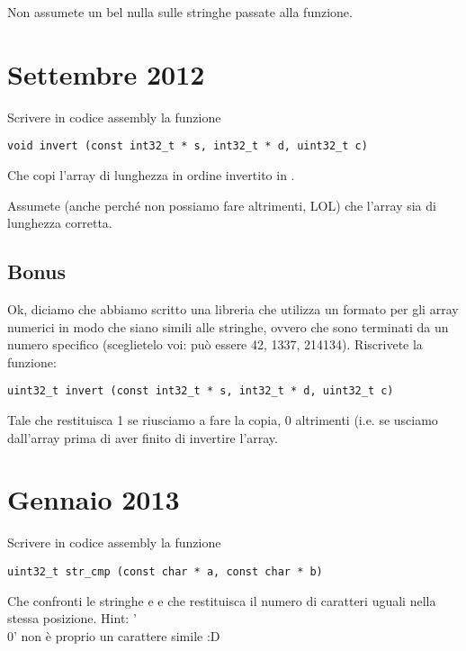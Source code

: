 \documentclass[a4paper]{memoir}
\begin{document}
      Non assumete un bel nulla sulle stringhe passate alla funzione.
      
	\section{Settembre 2012}
	
	  Scrivere in codice assembly la funzione
    
    \begin{lstlisting}
void invert (const int32_t * s, int32_t * d, uint32_t c)
    \end{lstlisting}
    
    Che copi l'array  di lunghezza  in ordine invertito in .
    
    Assumete (anche perché non possiamo fare altrimenti, LOL) che l'array  sia di lunghezza corretta.
    
    \subsection{Bonus}
    
      Ok, diciamo che abbiamo scritto una libreria che utilizza un formato per gli array numerici in modo
      che siano simili alle stringhe, ovvero che sono terminati da un numero specifico (sceglietelo voi: può essere 42, 1337,
      214134). Riscrivete la funzione:
      
      \begin{lstlisting}
uint32_t invert (const int32_t * s, int32_t * d, uint32_t c)
      \end{lstlisting}
      
      Tale che restituisca 1 se riusciamo a fare la copia, 0 altrimenti (i.e. se usciamo dall'array prima di aver finito
      di invertire l'array.
      
	\section{Gennaio 2013}
	
	  Scrivere in codice assembly la funzione
    
    \begin{lstlisting}
uint32_t str_cmp (const char * a, const char * b)
    \end{lstlisting}
    
    Che confronti le stringhe  e  e che restituisca il numero di caratteri uguali nella stessa posizione.
    Hint: '\\0' non è proprio un carattere simile :D    
    
\end{document}
